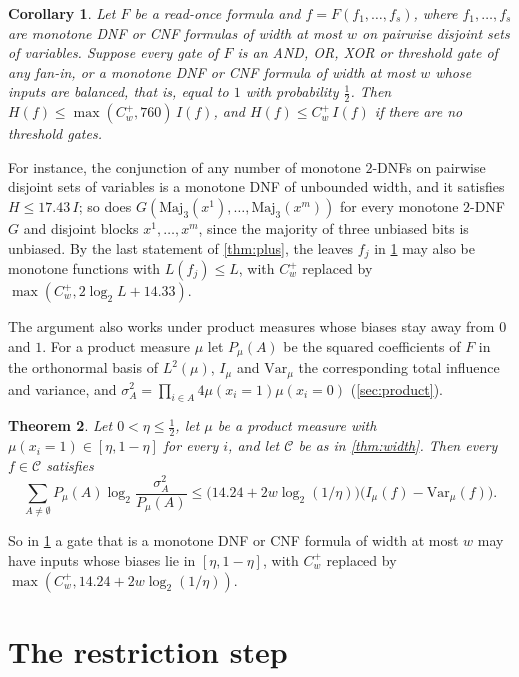 \documentclass[11pt]{amsart}
\newtheorem{theorem}{Theorem}[section]
\newtheorem{corollary}[theorem]{Corollary}
\theoremstyle{remark}
\newcommand{\Var}{\mathrm{Var}}
\begin{document}
\begin{corollary}\label{cor:compose}
Let $F$ be a read-once formula and $f=F(f_1,\dots,f_s)$, where $f_1,\dots,f_s$ are monotone DNF or CNF formulas of
width at most $w$ on pairwise disjoint sets of variables. Suppose every gate of $F$ is an AND, OR, XOR or threshold gate
of any fan-in, or a monotone DNF or CNF formula of width at most $w$ whose inputs are balanced, that is, equal to $1$
with probability $\frac12$. Then $H(f)\le\max(C^+_w,760)\,I(f)$, and $H(f)\le C^+_w\,I(f)$ if there are no threshold
gates.
\end{corollary}

For instance, the conjunction of any number of monotone $2$-DNFs on pairwise disjoint sets of variables is a monotone
DNF of unbounded width, and it satisfies $H\le17.43\,I$; so does $G(\mathrm{Maj}_3(x^1),\dots,\mathrm{Maj}_3(x^m))$ for
every monotone $2$-DNF $G$ and disjoint blocks $x^1,\dots,x^m$, since the majority of three unbiased bits is
unbiased. By the last statement of \cref{thm:plus}, the leaves $f_j$ in \cref{cor:compose} may also be monotone
functions with $L(f_j)\le L$, with $C^+_w$ replaced by $\max(C^+_w,2\log_2L+14.33)$.

The argument also works under product measures whose biases stay away from $0$ and $1$. For a product measure $\mu$ let
$P_\mu(A)$ be the squared coefficients of $F$ in the orthonormal basis of $L^2(\mu)$, $I_\mu$ and $\Var_\mu$ the
corresponding total influence and variance, and $\sigma_A^2=\prod_{i\in A}4\mu(x_i=1)\mu(x_i=0)$ (\cref{sec:product}).

\begin{theorem}\label{thm:product}
Let $0<\eta\le\frac12$, let $\mu$ be a product measure with $\mu(x_i=1)\in[\eta,1-\eta]$ for every $i$, and let
$\mathcal C$ be as in \cref{thm:width}. Then every $f\in\mathcal C$ satisfies
\[
\sum_{A\neq\emptyset}P_\mu(A)\log_2\frac{\sigma_A^2}{P_\mu(A)}\le\bigl(14.24+2w\log_2(1/\eta)\bigr)\bigl(I_\mu(f)-\Var_\mu(f)\bigr).
\]
\end{theorem}

So in \cref{cor:compose} a gate that is a monotone DNF or CNF formula of width at most $w$ may have inputs whose biases
lie in $[\eta,1-\eta]$, with $C^+_w$ replaced by $\max(C^+_w,14.24+2w\log_2(1/\eta))$.

\section{The restriction step}
\end{document}
